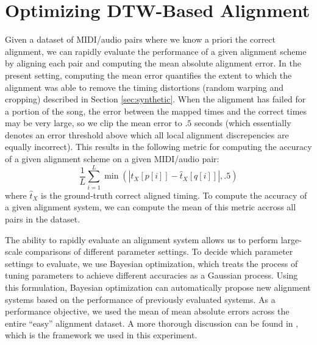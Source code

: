 \documentclass{article}
\begin{document}
\section{Optimizing DTW-Based Alignment}
\label{sec:optimizing}

Given a dataset of MIDI/audio pairs where we know a priori the correct alignment, we can rapidly evaluate the performance of a given alignment scheme by aligning each pair and computing the mean absolute alignment error.
In the present setting, computing the mean error quantifies the extent to which the alignment was able to remove the timing distortions (random warping and cropping) described in Section \ref{sec:synthetic}.
When the alignment has failed for a portion of the song, the error between the mapped times and the correct times may be very large, so we clip the mean error to $.5$ seconds (which essentially denotes an error threshold above which all local alignment discrepencies are equally incorrect).
This results in the following metric for computing the accuracy of a given alignment scheme on a given MIDI/audio pair:
$$
\frac{1}{L}\sum_{i = 1}^{L} \min(|t_X[p[i]] - \hat{t}_X[q[i]]|, .5)
$$
where $\hat{t}_X$ is the ground-truth correct aligned timing.
To compute the accuracy of a given alignment system, we can compute the mean of this metric accross all pairs in the dataset.

The ability to rapidly evaluate an alignment system allows us to perform large-scale comparisons of different parameter settings.
To decide which parameter settings to evaluate, we use Bayesian optimization, which treats the process of tuning parameters to achieve different accuracies as a Gaussian process.
Using this formulation, Bayesian optimization can automatically propose new alignment systems based on the performance of previously evaluated systems.
As a performance objective, we used the mean of mean absolute errors across the entire ``easy'' alignment dataset.
A more thorough discussion can be found in \cite{snoek2012practical}, which is the framework we used in this experiment.
\end{document}
